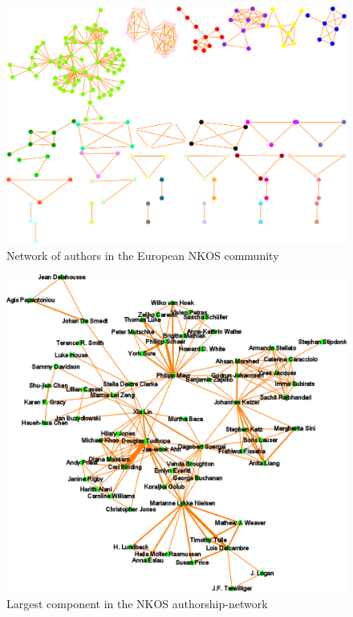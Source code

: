\documentclass[runningheads,a4paper]{llncs}
\begin{document}
\begin{figure}
	\centering
	\includegraphics[width=1.0\linewidth]{wholeNet}
	\vspace{-0.5em}
	\caption{Network of authors in the European NKOS community}
	\label{fig:wholenet}
	\vspace{-0.5em}
\end{figure}


\begin{figure}[H]
	\centering
	\includegraphics[width=0.9\linewidth]{largestComponent}
	\caption{Largest component in the NKOS authorship-network}
	\label{fig:largestComponent}
\end{figure}
\end{document}
